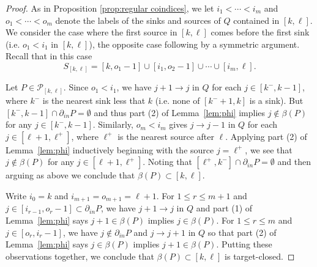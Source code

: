 \documentclass[12pt]{amsart}
\newcommand{\sayHW}[1]{\say[HW]{\color{violet}{\bf HW:}\;#1}}
\newcommand{\sayDR}[1]{\say[DR]{\color{red}{\bf DR:}\;#1}}
\newcommand{\cP}{\mathcal{P}}
\theoremstyle{remark}
\numberwithin{equation}{section}
\numberwithin{figure}{section}
\begin{document}
\begin{proof}
As in Proposition \ref{prop:regular coindices}, we let $i_1 < \cdots < i_m$ and $o_1 < \cdots < o_m$ denote the labels of the sinks and sources of $Q$ contained in $[k,\ell]$.  
We consider the case where the first source in $[k,\ell]$ comes before the first sink (i.e. $o_1 < i_1$ in $[k,\ell]$), the opposite case following by a symmetric argument.%
Recall that in this case
\[S_{[k,\ell]} = [k,o_1-1] \cup [i_1,o_2-1] \cup \cdots \cup [i_m,\ell].\]

Let $P \in \cP_{[k,\ell]}$.  Since $o_1<i_1$, we have $j+1\to j$ in $Q$ for each $j\in[k^-,k-1]$, where $k^-$ is the nearest sink less that $k$ (i.e. none of $[k^-+1,k]$ is a sink).  
But $[k^-,k-1]\cap\partial_{in}P=\emptyset$ and thus part (2) of Lemma~\ref{lem:phi} implies $j\notin\beta(P)$ for any $j\in[k^-,k-1]$.  
Similarly, $o_m<i_m$ gives $j\to j-1$ in $Q$ for each $j\in[\ell+1,\ell^+]$, where $\ell^+$ is the nearest source after $\ell$.  
Applying part (2) of Lemma~\ref{lem:phi} inductively beginning with the source $j=\ell^+$, we see that $j\notin\beta(P)$ for any $j\in[\ell+1,\ell^+]$.  
Noting that $[\ell^+,k^-]\cap\partial_{in}P=\emptyset$ and then arguing as above we conclude that $\beta(P)\subset[k,\ell]$.

Write $i_0=k$ and $i_{m+1}=o_{m+1}=\ell+1$.  For $1\le r\le m+1$ and $j\in[i_{r-1},o_r-1]\subset\partial_{in}P$, we have $j+1\to j$ in $Q$ and part (1) of Lemma~\ref{lem:phi} says $j+1\in\beta(P)$ implies $j\in\beta(P)$.  
For $1\le r\le m$ and $j\in[o_r,i_r-1]$, we have $j\notin\partial_{in}P$ and $j\to j+1$ in $Q$ so that part (2) of Lemma~\ref{lem:phi} says $j\in\beta(P)$ implies $j+1\in\beta(P)$.  
Putting these observations together, we conclude that $\beta(P)\subset[k,\ell]$ is target-closed.


\end{proof}
\end{document}
